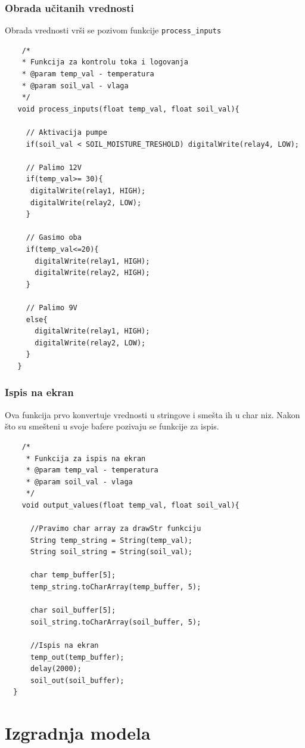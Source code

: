 \documentclass[a4paper,11pt]{book}
\begin{document}
  \subsection{Obrada učitanih vrednosti}

  Obrada vrednosti vrši se pozivom funkcije \verb|process_inputs|

  \begin{lstlisting}
    /*
    * Funkcija za kontrolu toka i logovanja
    * @param temp_val - temperatura
    * @param soil_val - vlaga
    */
   void process_inputs(float temp_val, float soil_val){
    
     // Aktivacija pumpe
     if(soil_val < SOIL_MOISTURE_TRESHOLD) digitalWrite(relay4, LOW);

     // Palimo 12V
     if(temp_val>= 30){
      digitalWrite(relay1, HIGH);
      digitalWrite(relay2, LOW);
     }

     // Gasimo oba
     if(temp_val<=20){
       digitalWrite(relay1, HIGH);
       digitalWrite(relay2, HIGH);
     }

     // Palimo 9V
     else{
       digitalWrite(relay1, HIGH);
       digitalWrite(relay2, LOW);
     }
   }
    \end{lstlisting}

  
    \subsection{Ispis na ekran}

    Ova funkcija prvo konvertuje vrednosti u stringove i smešta ih u char niz. Nakon što su smešteni u svoje bafere pozivaju se funkcije za ispis.

    
  \begin{lstlisting}
    /*
     * Funkcija za ispis na ekran
     * @param temp_val - temperatura
     * @param soil_val - vlaga
     */
    void output_values(float temp_val, float soil_val){

	  //Pravimo char array za drawStr funkciju
	  String temp_string = String(temp_val);
	  String soil_string = String(soil_val);

	  char temp_buffer[5];
	  temp_string.toCharArray(temp_buffer, 5);

	  char soil_buffer[5];
	  soil_string.toCharArray(soil_buffer, 5);

	  //Ispis na ekran
	  temp_out(temp_buffer);
	  delay(2000);
	  soil_out(soil_buffer);  
  }
    \end{lstlisting}

\chapter{Izgradnja modela}
\end{document}
